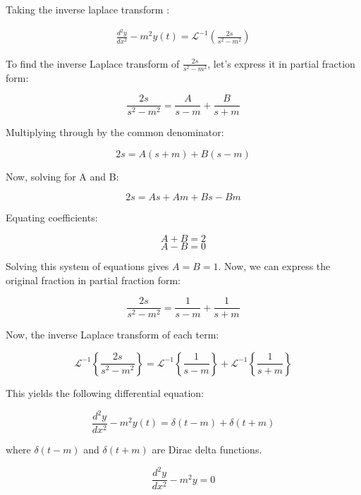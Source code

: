 \documentclass[journal,12pt,twocolumn]{IEEEtran}
\theoremstyle{remark}
\begin{document}
Taking the inverse laplace transform : 

\begin{align}
\frac{d^2y}{dx^2} - m^2y(t) = \mathcal{L}^{-1}\left(\frac{2s}{s^2 - m^2}\right)
\end{align}

To find the inverse Laplace transform of \(\frac{2s}{s^2 - m^2}\), let's express it in partial fraction form:

\begin{equation}
\frac{2s}{s^2 - m^2} = \frac{A}{s - m} + \frac{B}{s + m}
\end{equation}

Multiplying through by the common denominator:

\begin{equation}
2s = A(s + m) + B(s - m)
\end{equation}

Now, solving for A and B:

\begin{equation}
2s = As + Am + Bs - Bm
\end{equation}

Equating coefficients:

\begin{equation}
A + B = 2
\end{equation}
\begin{equation}
A - B = 0
\end{equation}

Solving this system of equations gives \(A = B = 1\). Now, we can express the original fraction in partial fraction form:

\begin{equation}
\frac{2s}{s^2 - m^2} = \frac{1}{s - m} + \frac{1}{s + m}
\end{equation}

Now, the inverse Laplace transform of each term:

\begin{equation}
\mathcal{L}^{-1}\left\{\frac{2s}{s^2 - m^2}\right\} = \mathcal{L}^{-1}\left\{\frac{1}{s - m}\right\} + \mathcal{L}^{-1}\left\{\frac{1}{s + m}\right\}
\end{equation}

This yields the following differential equation:

\begin{equation}
\frac{d^{2}y}{dx^{2}} - m^2y(t) = \delta(t - m) + \delta(t + m)
\end{equation}

where \(\delta(t - m)\) and \(\delta(t + m)\) are Dirac delta functions.

\begin{equation}
    \frac{d^{2}y}{dx^{2}} - m^2y = 0
\end{equation}
\end{document}
